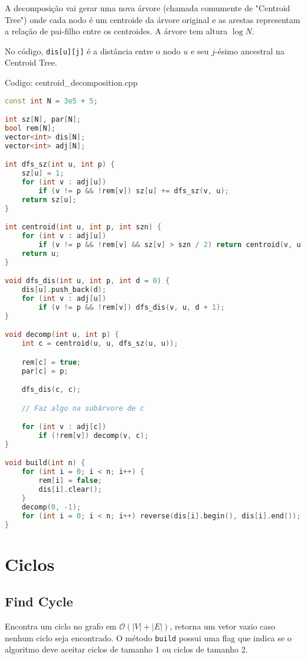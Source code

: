 \documentclass[10pt, a4paper, oneside]{book}
\begin{document}
A decomposição vai gerar uma nova árvore (chamada comumente de "Centroid Tree") onde cada nodo é um centroide da árvore original e as arestas representam a relação de pai-filho entre os centroides. A árvore tem altura $\log N$.



No código, \texttt{dis[u][j]} é a distância entre o nodo $u$ e seu $j$-ésimo ancestral na Centroid Tree.

\hfill

Codigo: centroid\_decomposition.cpp

\begin{lstlisting}[language=C++]
const int N = 3e5 + 5;

int sz[N], par[N];
bool rem[N];
vector<int> dis[N];
vector<int> adj[N];

int dfs_sz(int u, int p) {
    sz[u] = 1;
    for (int v : adj[u])
        if (v != p && !rem[v]) sz[u] += dfs_sz(v, u);
    return sz[u];
}

int centroid(int u, int p, int szn) {
    for (int v : adj[u])
        if (v != p && !rem[v] && sz[v] > szn / 2) return centroid(v, u, szn);
    return u;
}

void dfs_dis(int u, int p, int d = 0) {
    dis[u].push_back(d);
    for (int v : adj[u])
        if (v != p && !rem[v]) dfs_dis(v, u, d + 1);
}

void decomp(int u, int p) {
    int c = centroid(u, u, dfs_sz(u, u));

    rem[c] = true;
    par[c] = p;

    dfs_dis(c, c);

    // Faz algo na subárvore de c

    for (int v : adj[c])
        if (!rem[v]) decomp(v, c);
}

void build(int n) {
    for (int i = 0; i < n; i++) {
        rem[i] = false;
        dis[i].clear();
    }
    decomp(0, -1);
    for (int i = 0; i < n; i++) reverse(dis[i].begin(), dis[i].end());
}\end{lstlisting}
\hfill

\section{Ciclos}
\subsection{Find Cycle}


Encontra um ciclo no grafo em $\mathcal{O}(|V| + |E|)$, retorna um vetor vazio caso nenhum ciclo seja encontrado. O método \texttt{build} possui uma flag que indica se o algoritmo deve aceitar ciclos de tamanho 1 ou ciclos de tamanho 2.
\hfill
\end{document}
